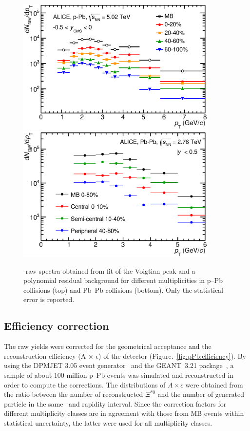 \begin{figure}[htbp]
\begin{center}
\includegraphics[width=10.0cm]{./Version1/FigChapter5/Extraction/pPbRawYield.eps}
\hspace{0.5cm}
\includegraphics[width=10.0cm]{./Version1/FigChapter5/Extraction/PbPbRawYield.eps}
\caption{\xis-raw spectra obtained from fit of the Voigtian peak and a polynomial residual background for different multiplicities in p--Pb collisions (top) and Pb--Pb collisions (bottom). Only the statistical error is reported.} 
 \label{fig:rawyield}
\end{center}
\end{figure}





\newpage
\subsection{Efficiency correction}\label{sec:MC} 
The raw yields were corrected for the geometrical acceptance and the reconstruction efficiency
(A $\times$ $\epsilon$) of the detector (Figure.~\ref{fig:pPb:efficiency}). By using the DPMJET 3.05 event generator~\cite{cite:DPMJET} and the GEANT~3.21 package~\cite{cite:GEANT}, a sample of about 100 million p--Pb events was simulated and reconstructed in order to compute the corrections. The distributions of $A\times\epsilon$ were obtained from the ratio between the number of reconstructed $\Xi^{*0}$ and the number of generated particle in the same \pt~and rapidity interval. Since the correction factors for different multiplicity classes are in agreement with those from MB events within statistical uncertainty, the latter were used for all multiplicity classes.

